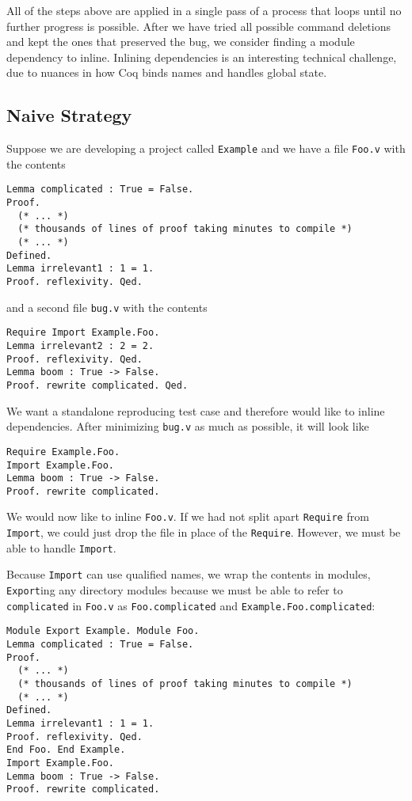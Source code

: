 \documentclass[a4paper,USenglish,cleveref,autoref,thm-restate]{lipics-v2021}
\begin{document}
All of the steps above are applied in a single pass of a process that loops until no further progress is possible.
After we have tried all possible command deletions and kept the ones that preserved the bug, we consider finding a module dependency to inline.
Inlining dependencies is an interesting technical challenge, due to nuances in how Coq binds names and handles global state.

\subsection{Naive Strategy}\label{sec:inline-deps}

Suppose we are developing a project called \verb|Example| and we have a file \verb|Foo.v| with the contents
\begin{verbatim}
Lemma complicated : True = False.
Proof.
  (* ... *)
  (* thousands of lines of proof taking minutes to compile *)
  (* ... *)
Defined.
Lemma irrelevant1 : 1 = 1.
Proof. reflexivity. Qed.
\end{verbatim}
and a second file \verb|bug.v| with the contents
\begin{verbatim}
Require Import Example.Foo.
Lemma irrelevant2 : 2 = 2.
Proof. reflexivity. Qed.
Lemma boom : True -> False.
Proof. rewrite complicated. Qed.
\end{verbatim}

We want a standalone reproducing test case and therefore would like to inline dependencies.
After minimizing \verb|bug.v| as much as possible, it will look like
\begin{verbatim}
Require Example.Foo.
Import Example.Foo.
Lemma boom : True -> False.
Proof. rewrite complicated.
\end{verbatim}

We would now like to inline \verb|Foo.v|.
If we had not split apart \verb|Require| from \verb|Import|, we could just drop the file in place of the \verb|Require|.
However, we must be able to handle \verb|Import|.

Because \verb|Import| can use qualified names, we wrap the contents in modules, \verb|Export|ing any directory modules because we must be able to refer to \verb|complicated| in \verb|Foo.v| as \verb|Foo.complicated| and \verb|Example.Foo.complicated|:
\begin{verbatim}
Module Export Example. Module Foo.
Lemma complicated : True = False.
Proof.
  (* ... *)
  (* thousands of lines of proof taking minutes to compile *)
  (* ... *)
Defined.
Lemma irrelevant1 : 1 = 1.
Proof. reflexivity. Qed.
End Foo. End Example.
Import Example.Foo.
Lemma boom : True -> False.
Proof. rewrite complicated.
\end{verbatim}
\end{document}
